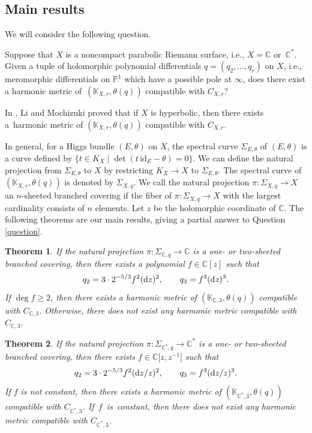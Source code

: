 \documentclass[10pt,a4paper]{amsart}
\numberwithin{equation}{section}
\newtheorem{Theorem}{Theorem}[section]
\newcommand{\C}{\mathbb{C}}
\newcommand{\ps}{\mathbb{P}}
\newcommand{\id}{\mathrm{id}}
\begin{document}
\subsection{Main results}
We will consider the following question.
\begin{Question}\label{question}
 Suppose that $X$ is a noncompact parabolic Riemann surface, i.e., $X=\C$ or~$\C^*$.
 Given a tuple of holomorphic polynomial differentials $q=(q_2,\dots,q_r)$ on $X$, i.e., meromorphic differentials on $\ps^1$ which have a possible pole at $\infty$, does there exist a harmonic metric of~$(\mathbb{K}_{X,r},\theta(q))$ compatible with $C_{X,r}$?
\end{Question}
\begin{Remark}
In \cite{LM2}, Li and Mochizuki proved that if $X$ is hyperbolic, then there exists a~harmonic metric of $(\mathbb{K}_{X,r},\theta(q))$ compatible with $C_{X,r}$.
\end{Remark}
In general, for a Higgs bundle $(E,\theta)$ on $X$, the spectral curve $\Sigma_{E,\theta}$ of $(E,\theta)$ is a curve defined by $\{ t\in K_{X} \mid \det(t\,\id_E -\theta)=0\}$. We can define the natural projection from $\Sigma_{E,\theta}$ to $X$ by restricting $K_X\to X$ to $\Sigma_{E,\theta}$. The spectral curve of $(\mathbb{K}_{X,r},\theta(q))$ is denoted by $\Sigma_{X,q}$. We call the natural projection $\pi\colon \Sigma_{X,q}\to X$ an $n$-sheeted branched covering if the fiber of $\pi\colon \Sigma_{X,q}\to X$ with the largest cardinality consists of $n$ elements. Let $z$ be the holomorphic coordinate of $\C$. The following theorems are our main results, giving a partial answer to Question \ref{question}.
\begin{Theorem}\label{main}
 If the natural projection $\pi\colon \Sigma_{\C,q}\to \C$ is a one- or two-sheeted branched covering, then there exists a polynomial $f\in \C[z]$ such that
 \begin{equation*}
 q_2 = 3\cdot 2^{-5/3}f^2 ({\rm d}z)^2, \qquad q_3 = f^3 ({\rm d}z)^3.
 \end{equation*}
 If $\deg{f}\geq 2$, then there exists a harmonic metric of $(\mathbb{K}_{\C,3},\theta(q))$ compatible with $C_{\C,3}$. Otherwise, there does not exist any harmonic metric compatible with $C_{\C,3}$.
\end{Theorem}
\begin{Theorem}\label{main_Cstar}
 If the natural projection $\pi\colon \Sigma_{\C^*,q}\to \C^*$ is a one- or two-sheeted branched covering, then there exists $f\in \C\bigl[z,z^{-1}\bigr]$ such that
 \begin{equation*}
 q_2 = 3\cdot 2^{-5/3}f^2 ({\rm d}z/z)^2, \qquad q_3 = f^3 ({\rm d}z/z)^3.
 \end{equation*}
 If $f$ is not constant, then there exists a harmonic metric of $(\mathbb{K}_{\C^*,3},\theta(q))$ compatible with $C_{\C^*,3}$. If~$f$~is~constant, then there does not exist any harmonic metric compatible with $C_{\C^*,3}$.
\end{Theorem}
\end{document}
